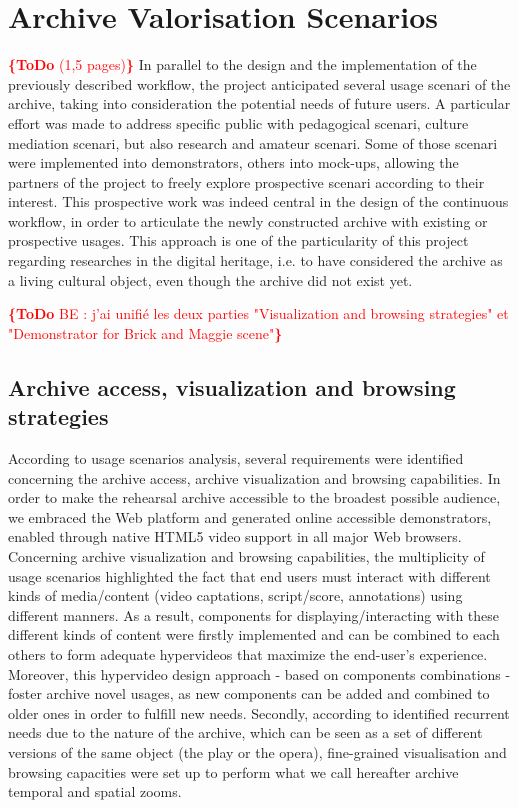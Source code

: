 \documentclass[conference]{IEEEtran}
\newcommand{\todo}[1]{\noindent\textcolor{red}{{\bf \{ToDo} #1{\bf \}}}}
\begin{document}
\section{Archive Valorisation Scenarios}
\todo{(1,5 pages)}
In parallel to the design and the implementation of the previously described workflow, the project anticipated several usage scenari of the archive, taking into consideration the potential needs of future users. A particular effort was made to address specific public with pedagogical scenari, culture mediation scenari, but also research and amateur scenari. Some of those scenari were implemented into demonstrators, others into mock-ups, allowing the partners of the project to freely explore prospective scenari according to their interest.
This prospective work was indeed central in the design of the continuous workflow, in order to articulate the newly constructed archive with existing or prospective usages. This approach is one of the particularity of this project regarding researches in the digital heritage, i.e. to have considered the archive as a living cultural object, even though the archive did not exist yet.

\todo{BE : j'ai unifié les deux parties "Visualization and browsing strategies" et "Demonstrator for Brick and Maggie scene"}

\subsection{Archive access, visualization and browsing strategies}
According to usage scenarios analysis, several requirements were identified concerning the archive access, archive visualization and browsing capabilities.
In order to make the rehearsal archive accessible to the broadest possible audience, we embraced the Web platform and generated online accessible demonstrators, enabled through native HTML5 video support in all major Web browsers.\newline
Concerning archive visualization and browsing capabilities, the multiplicity of usage scenarios highlighted the fact that end users must interact with different kinds of media/content (video captations, script/score, annotations) using different manners. As a result, components for displaying/interacting with these different kinds of content were firstly implemented and can be combined to each others to form adequate hypervideos that maximize the end-user's experience. Moreover, this hypervideo design approach - based on components combinations - foster archive novel usages, as new components can be added and combined to older ones in order to fulfill new needs.\newline
Secondly, according to identified recurrent needs due to the nature of the archive, which can be seen as a set of different versions of the same object (the play or the opera), fine-grained visualisation and browsing capacities were set up to perform what we call hereafter archive temporal and spatial zooms.
\end{document}
